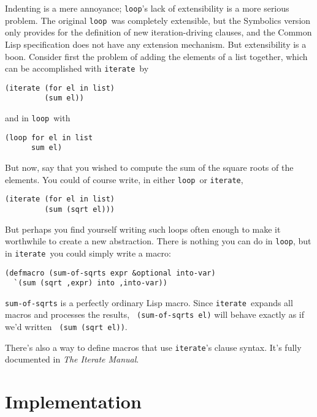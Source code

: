 \documentclass[12pt]{article}
\newcommand{\lisp}{\tt}
\newcommand{\iter}{{\lisp iterate}}
\newcommand{\looP}{{\lisp loop}}
\newcommand{\iman}{{\em The Iterate Manual\/}}
\begin{document}
Indenting is a mere annoyance; \looP's lack of extensibility is a more
serious problem.  The original \looP\ was completely extensible, but
the Symbolics version only provides for the definition of new
iteration-driving clauses, and the Common Lisp specification does not
have any extension mechanism.  But extensibility is a boon.  Consider
first the problem of adding the elements of a list together, which can
be accomplished with \iter\ by

\pagebreak[3]
\begin{verbatim}
(iterate (for el in list)
         (sum el))
\end{verbatim}

and in \looP\ with

\begin{verbatim}
(loop for el in list
      sum el)
\end{verbatim}

But now, say that you wished to compute the sum of the square roots of the
elements.  You could of course write, in either \looP\ or \iter,

\begin{verbatim}
(iterate (for el in list)
         (sum (sqrt el)))
\end{verbatim}

But perhaps you find yourself writing such loops often enough to make
it worthwhile to create a new abstraction.  There is nothing you can
do in \looP, but in \iter\ you could simply write a macro:

\begin{verbatim}
(defmacro (sum-of-sqrts expr &optional into-var)
  `(sum (sqrt ,expr) into ,into-var))
\end{verbatim}

{\lisp sum-of-sqrts} is a perfectly ordinary Lisp macro. Since
\iter\ expands all macros and processes the results, {\lisp
(sum-of-sqrts el)} will behave exactly as if we'd written {\lisp
(sum (sqrt el))}.

There's also a way to define macros that use \iter's clause syntax.
It's fully documented in \iman.


\section{Implementation}
\end{document}

